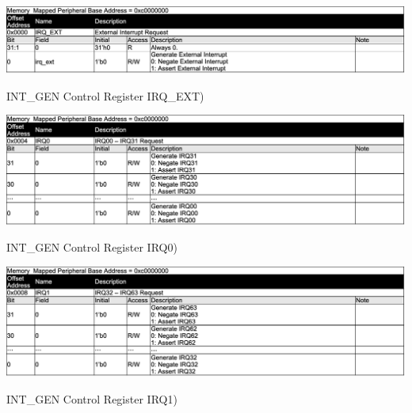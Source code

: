 \begin{table}[H]
    \includegraphics[width=1.0\columnwidth]{./Table/REG_IRQEXT.png}
    \caption{INT\_GEN Control Register IRQ\_EXT)}
    \label{tb:REG_IRQEXT}
\end{table}
\begin{table}[H]
    \includegraphics[width=1.0\columnwidth]{./Table/REG_IRQ0.png}
    \caption{INT\_GEN Control Register IRQ0)}
    \label{tb:REG_IRQ0}
\end{table}
\begin{table}[H]
    \includegraphics[width=1.0\columnwidth]{./Table/REG_IRQ1.png}
    \caption{INT\_GEN Control Register IRQ1)}
    \label{tb:REG_IRQ1}
\end{table}

